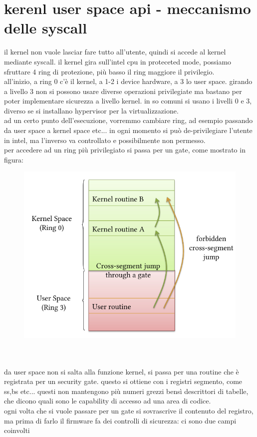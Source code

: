 \documentclass[12pt, oneside]{extbook} %
\begin{document}
\section{kerenl user space api - meccanismo delle syscall}
il kernel non vuole lasciar fare tutto all'utente, quindi si accede al kernel mediante syscall. il kernel gira sull'intel cpu in proteceted mode, possiamo sfruttare 4 ring di protezione, più basso il ring maggiore il privilegio.\\all'inizio, a ring 0 c'è il kernel, a 1-2 i device hardware, a 3 lo user space. girando a livello 3 non si possono usare diverse operazioni privilegiate ma bastano per poter implementare sicurezza a livello kernel. in so comuni si usano i livelli 0 e 3, diverso se si installano hypervisor per la virtualizzazione.\\ad un certo punto dell'esecuzione, vorremmo cambiare ring, ad esempio passando da user space a kernel space etc... in ogni momento si può de-privilegiare l'utente in intel, ma l'inverso va controllato e possibilmente non permesso.\\per accedere ad un ring più privilegiato si passa per un gate, come mostrato in figura:\\
\begin{figure}[!h]
	\includegraphics[scale=0.4]{immagini/gates.png}
\end{figure}\\\\
da user space non si salta alla funzione kernel, si passa per una routine che è registrata per un security gate. questo si ottiene con i registri segmento, come ss,bs etc... questi non mantengono più numeri grezzi bensì descrittori di tabelle, che dicono quali sono le capability di accesso ad una area di codice.\\ogni volta che si vuole passare per un gate si sovrascrive il contenuto del registro, ma prima di farlo il firmware fa dei controlli di sicurezza: ci sono due campi coinvolti
\end{document}
